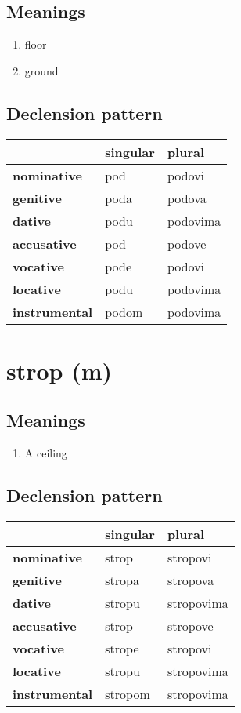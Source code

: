 \subsection*{Meanings}
\begin{enumerate}
\item floor
\item ground
\end{enumerate}
\subsection*{Declension pattern}
\begin{tabularx}{\linewidth}{Xll}
\toprule
{} & singular &    plural \\
\midrule
\textbf{nominative  } &      pod &    podovi \\
\textbf{genitive    } &     poda &    podova \\
\textbf{dative      } &     podu &  podovima \\
\textbf{accusative  } &      pod &    podove \\
\textbf{vocative    } &     pode &    podovi \\
\textbf{locative    } &     podu &  podovima \\
\textbf{instrumental} &    podom &  podovima \\
\bottomrule
\end{tabularx}

\filbreak
\section{strop (m)}
\subsection*{Meanings}
\begin{enumerate}
\item A ceiling
\end{enumerate}
\subsection*{Declension pattern}
\begin{tabularx}{\linewidth}{Xll}
\toprule
{} & singular &      plural \\
\midrule
\textbf{nominative  } &    strop &    stropovi \\
\textbf{genitive    } &   stropa &    stropova \\
\textbf{dative      } &   stropu &  stropovima \\
\textbf{accusative  } &    strop &    stropove \\
\textbf{vocative    } &   strope &    stropovi \\
\textbf{locative    } &   stropu &  stropovima \\
\textbf{instrumental} &  stropom &  stropovima \\
\bottomrule
\end{tabularx}

